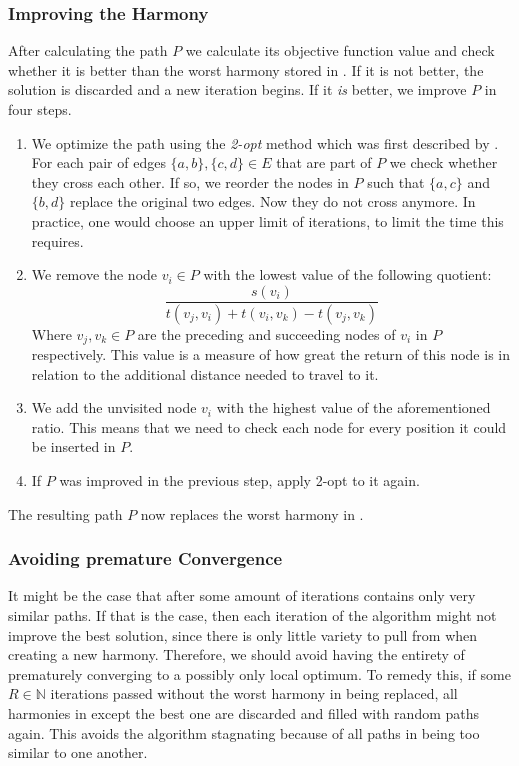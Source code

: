 \subsubsection{Improving the Harmony}
\label{subsubsec:04:createharmony}

After calculating the path $P$ we calculate its objective function value and check whether it is better than the worst harmony stored in \hm{}.
If it is not better, the solution is discarded and a new iteration begins.
If it \emph{is} better, we improve $P$ in four steps.

\begin{enumerate}
	\item We optimize the path using the \emph{2-opt} method which was first described by \citeauthor{croes_method_1958} \cite{croes_method_1958}.
	      For each pair of edges $\{a,b\}, \{c, d\} \in E$ that are part of $P$ we check whether they cross each other.
	      If so, we reorder the nodes in $P$ such that $\{a, c\}$ and $\{b, d\}$ replace the original two edges. Now they do not cross anymore. In practice, one would choose an upper limit of iterations, to limit the time this requires.
	\item We remove the node $v_i \in P$ with the lowest value of the following quotient:
	      \begin{equation*}
		      \frac{s(v_i)}{t(v_j, v_i) + t(v_i, v_k) - t(v_j, v_k)}
	      \end{equation*}
	      Where $v_j, v_k \in P$ are the preceding and succeeding nodes of $v_i$ in $P$ respectively.
	      This value is a measure of how great the return of this node is in relation to the additional distance needed to travel to it.
	\item We add the unvisited node $v_i$ with the highest value of the aforementioned ratio.
	      This means that we need to check each node for every position it could be inserted in $P$.
	\item If $P$ was improved in the previous step, apply 2-opt to it again.
\end{enumerate}

The resulting path $P$ now replaces the worst harmony in \hm{}.

\subsubsection{Avoiding premature Convergence}

It might be the case that after some amount of iterations \hm{} contains only very similar paths.
If that is the case, then each iteration of the algorithm might not improve the best solution, since there is only little variety to pull from when creating a new harmony.
Therefore, we should avoid having the entirety of \hm{} prematurely converging to a possibly only local optimum.
To remedy this, if some $R \in \mathbb{N}$ iterations passed without the worst harmony in \hm{} being replaced,
all harmonies in \hm{} except the best one are discarded and filled with random paths again.
This avoids the algorithm stagnating because of all paths in \hm{} being too similar to one another.
